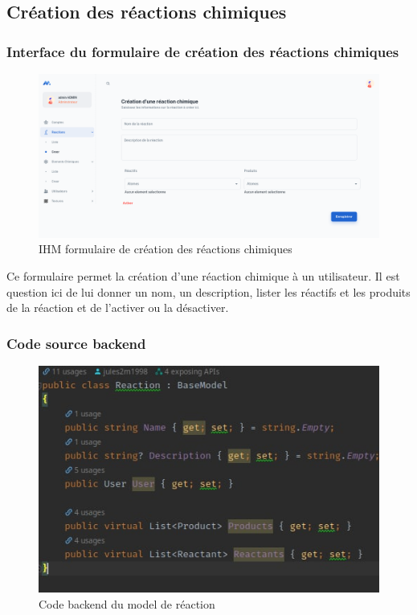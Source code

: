 \subsection{Création des réactions chimiques}

\subsubsection{Interface du formulaire de création des réactions chimiques}

\begin{figure}[H]
	\centering
	\includegraphics[width=1\textwidth]{img/icrc}
	\caption{IHM formulaire de création des réactions chimiques}
\end{figure}

Ce formulaire permet la création d'une réaction chimique à un utilisateur. Il est question ici de lui donner un nom, un description,
lister les réactifs et les produits de la réaction et de l'activer ou la désactiver.

\subsubsection{Code source backend}

\begin{figure}[H]
	\centering
	\includegraphics[width=1\textwidth]{img/mre}
	\caption{Code backend du model de réaction}
\end{figure}

